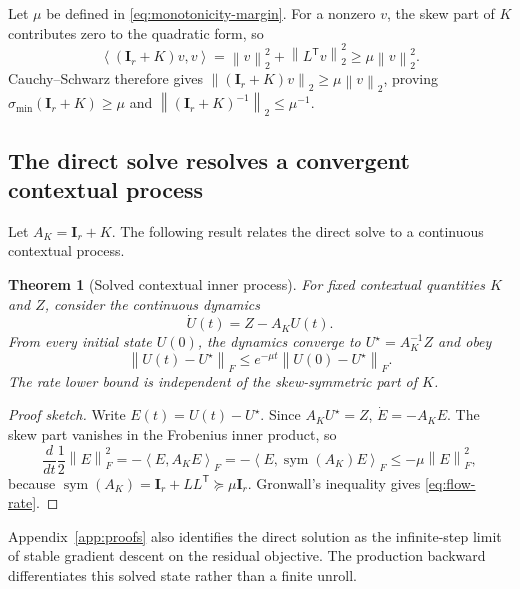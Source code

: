 \documentclass[10pt]{article}
\newtheorem{theorem}{Theorem}[section]
\newcommand{\I}{\mathbf{I}}
\newcommand{\T}{\mathsf{T}}
\newcommand{\norm}[1]{\left\lVert #1 \right\rVert}
\newcommand{\inner}[2]{\left\langle #1, #2 \right\rangle}
\newcommand{\sym}{\operatorname{sym}}
\begin{document}
Let $\mu$ be defined in \eqref{eq:monotonicity-margin}.  For a nonzero $v$,
the skew part of $K$ contributes zero to the quadratic form, so
\begin{equation}
    \inner{(\I_r+K)v}{v}
    =\norm{v}_2^2+\norm{L^\T v}_2^2\geq\mu\norm{v}_2^2.
\end{equation}
Cauchy--Schwarz therefore gives
$\norm{(\I_r+K)v}_2\geq\mu\norm{v}_2$, proving
$\sigma_{\min}(\I_r+K)\geq\mu$ and
$\norm{(\I_r+K)^{-1}}_2\leq\mu^{-1}$.

\subsection{The direct solve resolves a convergent contextual process}
\label{sec:solved-inner-process}

Let $A_K=\I_r+K$.  The following result relates the direct solve to a
continuous contextual process.

\begin{theorem}[Solved contextual inner process]
\label{thm:inner-process}
For fixed contextual quantities $K$ and $Z$, consider the continuous dynamics
\begin{equation}
    \dot U(t)=Z-A_KU(t).
\label{eq:contextual-flow}
\end{equation}
From every initial state $U(0)$, the dynamics converge to
$U^\star=A_K^{-1}Z$ and obey
\begin{equation}
    \norm{U(t)-U^\star}_F
    \leq e^{-\mu t}\norm{U(0)-U^\star}_F.
\label{eq:flow-rate}
\end{equation}
The rate lower bound is independent of the skew-symmetric part of $K$.

\end{theorem}

\begin{proof}[Proof sketch]
Write $E(t)=U(t)-U^\star$.  Since $A_KU^\star=Z$,
$\dot E=-A_KE$.  The skew part vanishes in the Frobenius inner product, so
\begin{equation}
    \frac{d}{dt}\frac12\norm{E}_F^2
    =-\inner{E}{A_KE}_F
    =-\inner{E}{\sym(A_K)E}_F
    \leq-\mu\norm{E}_F^2,
\end{equation}
because $\sym(A_K)=\I_r+LL^\T\succeq\mu\I_r$.  Gronwall's inequality gives
\eqref{eq:flow-rate}.
\end{proof}

Appendix~\ref{app:proofs} also identifies the direct solution as the
infinite-step limit of stable gradient descent on the residual objective.  The
production backward differentiates this solved state rather than a finite
unroll.
\end{document}

